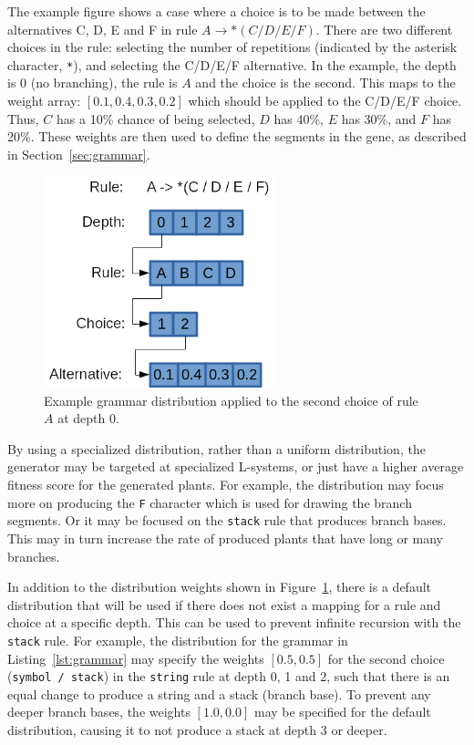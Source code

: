 The example figure shows a case where a choice is to be made between the alternatives C, D, E and F in rule $A \rightarrow *(C / D / E / F)$.
There are two different choices in the rule: selecting the number of repetitions (indicated by the asterisk character, \texttt{*}), and selecting the C/D/E/F alternative.
In the example, the depth is 0 (no branching), the rule is $A$ and the choice is the second.
This maps to the weight array: $[0.1, 0.4, 0.3, 0.2]$ which should be applied to the C/D/E/F choice.
Thus, $C$ has a 10\% chance of being selected, $D$ has 40\%, $E$ has 30\%, and $F$ has 20\%.
These weights are then used to define the segments in the gene, as described in Section~\ref{sec:grammar}.

\begin{figure}
    \centering
    \includegraphics[width=0.6\textwidth]{figures/distribution}
    \caption[Example grammar distribution]{Example grammar distribution applied to the second choice of rule $A$ at depth 0.}
    \label{fig:distribution}
\end{figure}

By using a specialized distribution, rather than a uniform distribution, the generator may be targeted at specialized \glspl{L-system}, or just have a higher average fitness score for the generated plants.
For example, the distribution may focus more on producing the \texttt{F} character which is used for drawing the branch segments.
Or it may be focused on the \texttt{stack} rule that produces branch bases.
This may in turn increase the rate of produced plants that have long or many branches.

In addition to the distribution weights shown in Figure~\ref{fig:distribution}, there is a default distribution that will be used if there does not exist a mapping for a rule and choice at a specific depth.
This can be used to prevent infinite recursion with the \texttt{stack} rule.
For example, the distribution for the grammar in Listing~\ref{lst:grammar} may specify the weights $[0.5, 0.5]$ for the second choice (\texttt{symbol / stack}) in the \texttt{string} rule at depth 0, 1 and 2, such that there is an equal change to produce a string and a stack (branch base).
To prevent any deeper branch bases, the weights $[1.0, 0.0]$ may be specified for the default distribution, causing it to not produce a stack at depth 3 or deeper.

